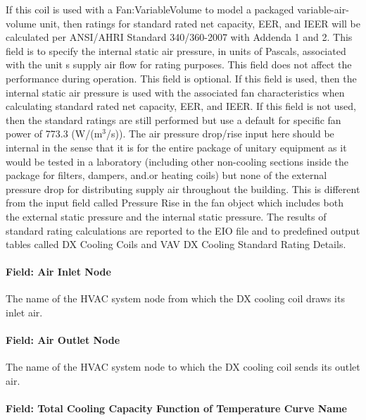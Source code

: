 If this coil is used with a Fan:VariableVolume to model a packaged variable-air-volume unit, then ratings for standard rated net capacity, EER, and IEER will be calculated per ANSI/AHRI Standard 340/360-2007 with Addenda 1 and 2. This field is to specify the internal static air pressure, in units of Pascals, associated with the unit s supply air flow for rating purposes. This field does not affect the performance during operation. This field is optional. If this field is used, then the internal static air pressure is used with the associated fan characteristics when calculating standard rated net capacity, EER, and IEER. If this field is not used, then the standard ratings are still performed but use a default for specific fan power of 773.3 (W/(m\(^{3}\)/s)). The air pressure drop/rise input here should be internal in the sense that it is for the entire package of unitary equipment as it would be tested in a laboratory (including other non-cooling sections inside the package for filters, dampers, and.or heating coils) but none of the external pressure drop for distributing supply air throughout the building. This is different from the input field called Pressure Rise in the fan object which includes both the external static pressure and the internal static pressure. The results of standard rating calculations are reported to the EIO file and to predefined output tables called DX Cooling Coils and VAV DX Cooling Standard Rating Details.

\paragraph{Field: Air Inlet Node}\label{field-air-inlet-node}

The name of the HVAC system node from which the DX cooling coil draws its inlet air.

\paragraph{Field: Air Outlet Node}\label{field-air-outlet-node}

The name of the HVAC system node to which the DX cooling coil sends its outlet air.

\paragraph{Field: Total Cooling Capacity Function of Temperature Curve Name}\label{field-total-cooling-capacity-function-of-temperature-curve-name-1}

